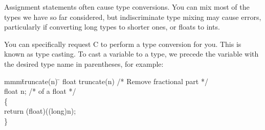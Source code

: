      Assignment statements often cause type conversions. You can
mix most of the  types we  have so  far considered,  but
indiscriminate type mixing may cause errors, particularly if
converting long types to shorter ones, or {\cd float}s to {\cd int}s.

     You can specifically request C to perform a type conversion for
you. This is known  as {\ms type  casting}. To  cast a  variable to a
type,  we  precede  the variable with the desired type name in
parentheses, for example:
\begin{code}
mmm\= truncate(n) \tab\tab \= \kill
float truncate(n) \>\> /* Remove fractional part */ \\
\> float n;         \> /* of a float             */ \\
\{ \\
 \>   return (float)((long)n); \\
\}
\end{code}


